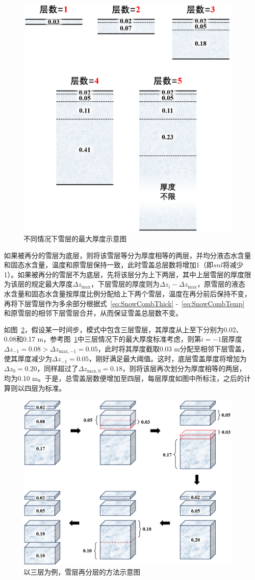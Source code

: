 {
  \begin{figure}[htbp]
    \centering
    \includegraphics[width=0.6\columnwidth]{Figures/雪盖土壤热力过程/不同情况下雪层的最大厚度.png}
    \caption{不同情况下雪层的最大厚度示意图}
    \label{fig:不同情况下雪层的最大厚度}
  \end{figure}
}

如果被再分的雪层为底层，则将该雪层等分为厚度相等的两层，并均分液态水含量和固态水含量，温度和原雪层保持一致，此时雪盖总层数将增加1（即$snl$将减少1）。如果被再分的雪层不为底层，先将该层分为上下两层，其中上层雪层的厚度限为该层的规定最大厚度$\Delta z_{\mathrm{max}}$，下层雪层的厚度则为$\Delta z_i - \Delta z_{\mathrm{max}}$，原雪层的液态水含量和固态水含量按厚度比例分配给上下两个雪层，温度在再分前后保持不变，再将下层雪层作为多余部分根据式~\eqref{eq:SnowCombThick} -~\eqref{eq:SnowCombTemp}和原雪层的相邻下层雪层合并，从而保证雪盖总层数不变。

如图~\ref{fig:以三层为例雪层再分层的方法}，假设某一时间步，模式中包含三层雪层，其厚度从上至下分别为0.02、0.08和0.17 m，参考图~\ref{fig:不同情况下雪层的最大厚度}中三层情况下的最大厚度标准考虑，则第$i=-1$层厚度$\Delta z_{-1}=0.08 > \Delta z_{\mathrm{max,-1}}=0.05 $，此时将其厚度截取0.03 m分配至相邻下层雪盖，使其厚度减少为$\Delta z_{-1}=0.05$，刚好满足最大阈值。这时，底层雪盖厚度将增加为$\Delta z_{0}=0.20$，同样超过了$\Delta z_{\mathrm{max,0}}=0.18$，则将该层再次划分为厚度相等的两层，均为0.10 m。于是，总雪盖层数便增加至四层，每层厚度如图中所标注，之后的计算则以四层为标准。

{
  \begin{figure}[htbp]
    \centering
    \includegraphics[width=0.8\columnwidth]{Figures/雪盖土壤热力过程/以三层为例雪层再分层的方法.png}
    \caption{以三层为例，雪层再分层的方法示意图}
    \label{fig:以三层为例雪层再分层的方法}
  \end{figure}
}
